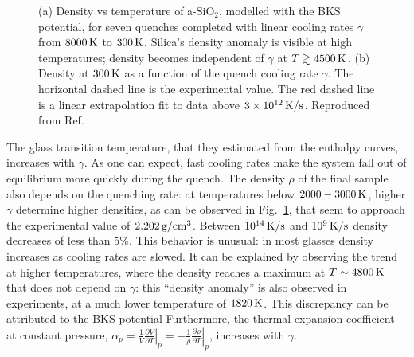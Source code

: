 \begin{figure}[!tb]
    \centering
    \hfill
    \caption{
    (a) Density vs temperature of a-SiO$_2$, modelled with the BKS potential, for seven quenches completed with linear cooling rates $\gamma$ from $8000\,\mathrm{K}$ to $300\,\mathrm{K}$. Silica's density anomaly is visible at high temperatures; density becomes independent of $\gamma$ at $T \gtrsim 4500\,\mathrm{K}$. 
    (b) Density at $300\,\mathrm{K}$ as a function of the quench cooling rate $\gamma$. The horizontal dashed line is the experimental value. The red dashed line is a linear extrapolation fit to data above $3\times 10^{12}\,\mathrm{K/s}$. 
    Reproduced from Ref.~\cite{Lane2015}}
    \label{fig:silica-bks-density}
\end{figure}

The glass transition temperature, that they estimated from the enthalpy curves, increases with $\gamma$. As one can expect, fast cooling rates make the system fall out of equilibrium more quickly during the quench. 
The density $\rho$ of the final sample also depends on the quenching rate: at temperatures below $2000-3000\,\mathrm{K}$, higher $\gamma$ determine higher densities, as can be observed in Fig.~\ref{fig:silica-bks-density}, that seem to approach the experimental value of $2.202\,\mathrm{g/cm^3}$. Between $10^{14}\,\mathrm{K/s}$ and $10^{9}\,\mathrm{K/s}$ density decreases of less than $5\%$. 
This behavior is unusual: in most glasses density increases as cooling rates are slowed. It can be explained by observing the trend at higher temperatures, where the density reaches a maximum at $T\sim 4800\,\mathrm{K}$ that does not depend on $\gamma$: this ``density anomaly'' is also observed in experiments, at a much lower temperature of $1820\,\mathrm{K}$. This discrepancy can be attributed to the BKS potential   
Furthermore, the thermal expansion coefficient at constant pressure, $\alpha_p = \frac{1}{V} \left.\frac{\partial V}{\partial T}\right|_p = -\frac{1}{\rho} \left.\frac{\partial \rho}{\partial T}\right|_p$, increases with $\gamma$.

